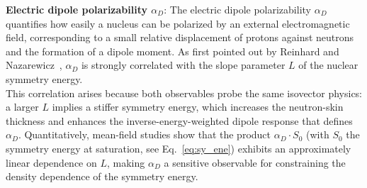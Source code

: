 %
\quad \textbf{Electric dipole polarizability $\alpha_D$}: The electric dipole polarizability $\alpha_D$ quantifies how easily a nucleus can be polarized by an external electromagnetic field, corresponding to a small relative displacement of protons against neutrons and the formation of a dipole moment. As first pointed out by Reinhard and Nazarewicz~\cite{reinhard2010information}, $\alpha_D$ is strongly correlated with the slope parameter $L$ of the nuclear symmetry energy.\\
This correlation arises because both observables probe the same isovector physics: a larger $L$ implies a stiffer symmetry energy, which increases the neutron-skin thickness and enhances the inverse-energy-weighted dipole response that defines $\alpha_D$. Quantitatively, mean-field studies show that the product $\alpha_D \cdot S_0$ (with $S_0$ the symmetry energy at saturation, see Eq.~\ref{eq:sy_ene}) exhibits an approximately linear dependence on $L$, making $\alpha_D$ a sensitive observable for constraining the density dependence of the symmetry energy.\\
